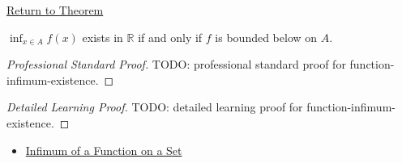 \newpage
{}
\label{prf:function-infimum-existence}

\begin{remark*}[Return]
\hyperref[thm:function-infimum-existence]{Return to Theorem}
\end{remark*}

\begin{theorem*}
\(\inf_{x\in A} f(x)\) exists in \(\mathbb{R}\) if and only if \(f\) is bounded below on \(A\).
\end{theorem*}

\begin{proof}[Professional Standard Proof]
\LRAProofBodyStart
TODO: professional standard proof for function-infimum-existence.
\end{proof}

\begin{proof}[Detailed Learning Proof]
\LRAProofBodyStart
TODO: detailed learning proof for function-infimum-existence.
\end{proof}

\begin{remark*}
\end{remark*}

\begin{dependencies}
\begin{itemize}
  \item \hyperref[def:function-infimum-on-set]{Infimum of a Function on a Set}
\end{itemize}
\end{dependencies}

\clearpage
